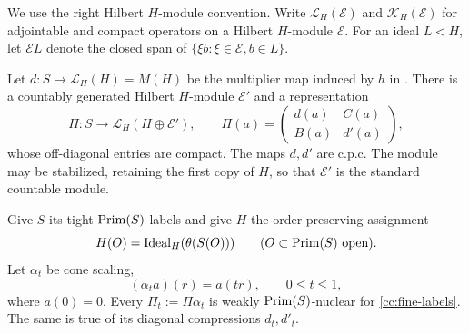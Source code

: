 We use the right Hilbert $H$-module convention.  Write
$\mathcal L_H(\mathcal E)$ and $\mathcal K_H(\mathcal E)$ for
adjointable and compact operators on a Hilbert $H$-module $\mathcal E$.
For an ideal $L\lhd H$, let $\mathcal E L$ denote the closed span
of $\{\xi b:\xi\in\mathcal E, b\in L\}$.

\begin{lemma}\label{cc:scaled-dilation}
Let $d:S\to\mathcal L_H(H)=M(H)$ be the multiplier map induced by
$h$ in .  There is a countably generated
Hilbert $H$-module $\mathcal E'$ and a representation
\begin{equation}\label{cc:dilation}
 \Pi:S\longrightarrow\mathcal L_H(H\oplus\mathcal E'),
 \qquad
 \Pi(a)=
 \begin{pmatrix}
 d(a)&C(a)\\ B(a)&d'(a)
 \end{pmatrix},
\end{equation}
whose off-diagonal entries are compact.  The maps $d,d'$ are c.p.c.
The module may be stabilized, retaining the first copy of $H$, so
that $\mathcal E'$ is the standard countable module.

Give $S$ its tight $\operatorname{Prim}(S)$-labels and give $H$ the order-preserving
assignment
\begin{equation}\label{cc:fine-labels}
 H(O)=\operatorname{Ideal}_H(\theta(S(O)))
 \qquad(O\subset\operatorname{Prim}(S)\text{ open}).
\end{equation}
Let $\alpha_t$ be cone scaling,
\[
 (\alpha_t a)(r)=a(tr),\qquad 0\le t\le1,
\]
where $a(0)=0$.  Every $\Pi_t:=\Pi\alpha_t$ is weakly
$\operatorname{Prim}(S)$-nuclear for \eqref{cc:fine-labels}.  The same is true
of its diagonal compressions $d_t,d'_t$.
\end{lemma}

